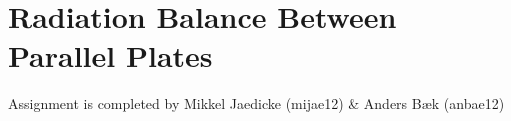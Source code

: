 \section*{Radiation Balance Between Parallel Plates}
Assignment is completed by Mikkel Jaedicke (mijae12) \& Anders Bæk (anbae12)

